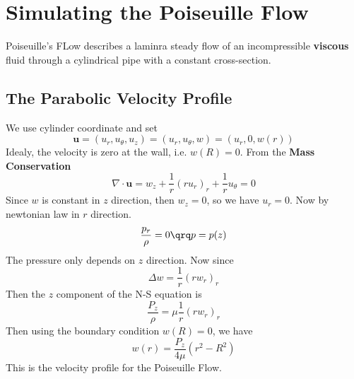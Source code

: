 \documentclass[../Immersed_Boundary_Method.tex]{subfiles}
\begin{document}
\section{Simulating the Poiseuille Flow}

Poiseuille's FLow describes a laminra steady flow of an incompressible \textbf{viscous} fluid through a cylindrical pipe with a constant cross-section.

\subsection{The Parabolic Velocity Profile}
\begin{center}
\end{center}
We use cylinder coordinate and set 
\[ \bm{u} = (u_r, u_\theta, u_z) = (u_r, u_\theta, w) = (u_r, 0, w(r))\]
Idealy, the velocity is zero at the wall, i.e. $w(R) = 0$. 
From the \textbf{Mass Conservation}
\begin{equation}
\nabla \cdot \bm{u} = w_z + \frac{1}{r} (r u_r)_r + \frac{1}{r} u_\theta = 0
\end{equation}
Since $w$ is constant in $z$ direction, then $w_z =0$, so we have $u_r = 0$. Now by newtonian law in $r$ direction. 
\[ \frac{p_r}{\rho} = 0 \qrq p = p(z)\]
The pressure only depends on $z$ direction. Now since 
\[ \Delta w = \frac{1}{r}(rw_r)_r\]
Then the $z$ component of the N-S equation is 
\[ \frac{P_z}{\rho} = \mu \frac{1}{r}(r w_r)_r\]
Then using the boundary condition $w(R) = 0$, we have 
\begin{equation}
\boxed{w(r) = \frac{P_z}{4\mu}(r^2-R^2)}
\end{equation}
This is the velocity profile for the Poiseuille Flow. \par
\end{document}

